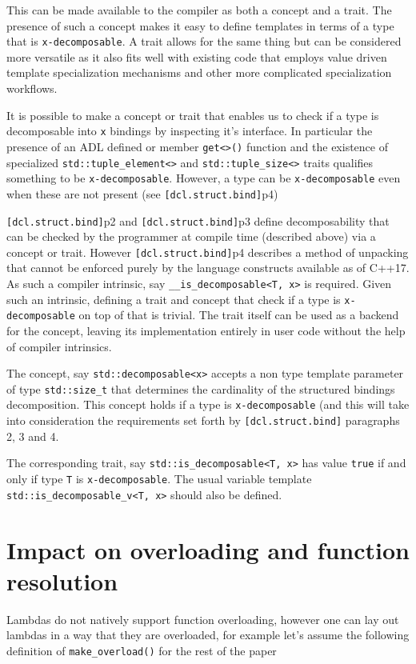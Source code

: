 \documentclass{article}
\begin{document}
This can be made available to the compiler as both a concept and a trait.  The
presence of such a concept makes it easy to define templates in terms of a
type that is \texttt{x-decomposable}.  A trait allows for the same thing but
can be considered more versatile as it also fits well with existing code that
employs value driven template specialization mechanisms and other more
complicated specialization workflows.

It is possible to make a concept or trait that enables us to check if a type
is decomposable into \texttt{x} bindings by inspecting it's interface.  In
particular the presence of an ADL defined or member \texttt{get<>()} function
and the existence of specialized \texttt{std::tuple\_element<>} and
\texttt{std::tuple\_size<>} traits qualifies something to be
\texttt{x-decomposable}.  However, a type can be \texttt{x-decomposable} even
when these are not present (see \texttt{[dcl.struct.bind]}p4)

\texttt{[dcl.struct.bind]}p2 and \texttt{[dcl.struct.bind]}p3 define
decomposability that can be checked by the programmer at compile time
(described above) via a concept or trait.  However
\texttt{[dcl.struct.bind]}p4 describes a method of unpacking that cannot be
enforced purely by the language constructs available as of C++17.  As such a
compiler intrinsic, say \texttt{\_\_is\_decomposable<T, x>} is required.
Given such an intrinsic, defining a trait and concept that check if a type is
\texttt{x-decomposable} on top of that is trivial.  The trait itself can be
used as a backend for the concept, leaving its implementation entirely in user
code without the help of compiler intrinsics.

The concept, say \texttt{std::decomposable<x>} accepts a non type template
parameter of type \texttt{std::size\_t} that determines the cardinality of the
structured bindings decomposition.  This concept holds if a type is
\texttt{x-decomposable} (and this will take into consideration the
requirements set forth by \texttt{[dcl.struct.bind]} paragraphs 2, 3 and 4.

The corresponding trait, say \texttt{std::is\_decomposable<T, x>} has value
\texttt{true} if and only if type \texttt{T} is \texttt{x-decomposable}.  The
usual variable template \texttt{std::is\_decomposable\_v<T, x>} should also be
defined.


\section{Impact on overloading and function resolution}
Lambdas do not natively support function overloading, however one can lay out
lambdas in a way that they are overloaded, for example let's assume the
following definition of \texttt{make\_overload()} for the rest of the paper
\end{document}
